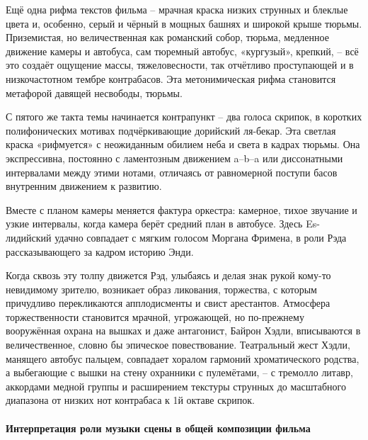 Ещё одна рифма текстов фильма -- мрачная краска низких струнных и блеклые цвета и, особенно, серый и чёрный в мощных башнях и широкой крыше тюрьмы.
Приземистая, но величественная как романский собор, тюрьма, медленное движение камеры и автобуса, сам тюремный автобус, «кургузый», крепкий, -- всё это создаёт ощущение массы, тяжеловесности, так отчётливо проступающей и в низкочастотном тембре контрабасов.
Эта метонимическая рифма становится метафорой давящей несвободы, тюрьмы.

С пятого же такта темы начинается контрапункт -- два голоса скрипок, в коротких полифонических мотивах подчёркивающие дорийский ля-бекар.
Эта светлая краска «рифмуется» с неожиданным обилием неба и света в кадрах тюрьмы.
Она экспрессивна, постоянно с ламентозным движением a--b--a или диссонатными интервалами между этими нотами, отличаясь от равномерной поступи басов внутренним движением к развитию.

Вместе с планом камеры меняется фактура оркестра: камерное, тихое звучание и узкие интервалы, когда камера берёт средний план в автобусе.
Здесь Es-лидийский удачно совпадает с мягким голосом Моргана Фримена, в роли Рэда рассказывающего за кадром историю Энди.

Когда сквозь эту толпу движется Рэд, улыбаясь и делая знак рукой кому-то невидимому зрителю, возникает образ ликования, торжества, с которым причудливо перекликаются апплодисменты и свист арестантов.
Атмосфера торжественности становится мрачной, угрожающей, но по-прежнему вооружённая охрана на вышках и даже антагонист, Байрон Хэдли, вписываются в величественное, словно бы эпическое повествование.
Театральный жест Хэдли, манящего автобус пальцем, совпадает хоралом гармоний хроматического родства, а выбегающие с вышки на стену охранники с пулемётами, -- с тремолло литавр, аккордами медной группы и расширением текстуры струнных до масштабного диапазона от низких нот контрабаса к 1й октаве скрипок.

\paragraph{Интерпретация роли музыки сцены в общей композиции фильма}\label{ux438ux43dux442ux435ux440ux43fux440ux435ux442ux430ux446ux438ux44f-ux440ux43eux43bux438-ux43cux443ux437ux44bux43aux438-ux441ux446ux435ux43dux44b-ux432-ux43eux431ux449ux435ux439-ux43aux43eux43cux43fux43eux437ux438ux446ux438ux438-ux444ux438ux43bux44cux43cux430-2}


